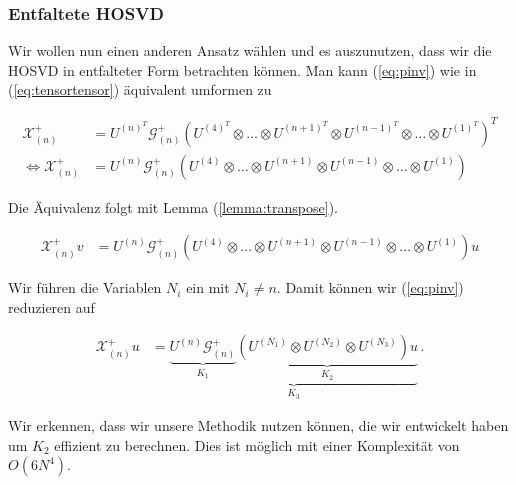 \subsubsection{Entfaltete HOSVD}
Wir wollen nun einen anderen Ansatz wählen und es auszunutzen, dass wir die HOSVD in entfalteter Form betrachten können.
Man kann (\ref{eq:pinv}) wie in (\ref{eq:tensortensor}) äquivalent umformen zu

\begin{equation}
\begin{aligned}
\mathscr{X}^{+}_{(n)}  &= U^{ (n) ^{T} }  \mathscr{G}^{+}_{(n)} ( U^{ (4) ^{T} } \otimes \dots \otimes U^{ (n+1) ^{T} } \otimes U^{ (n-1) ^{T} } \otimes \dots \otimes U^{ (1) ^{T} })^{T} \\ \iff
\mathscr{X}^{+}_{(n)} &= U^{ (n)  }  \mathscr{G}^{+}_{(n)} ( U^{ (4)  } \otimes \dots \otimes U^{ (n+1) } \otimes U^{ (n-1) } \otimes \dots \otimes U^{ (1) })
\end{aligned}
\end{equation}

Die Äquivalenz folgt mit Lemma (\ref{lemma:transpose}).

\begin{equation} \label{eq:pinvv}
\begin{aligned}
\mathscr{X}^{+}_{(n)}v&= U^{ (n)  }  \mathscr{G}^{+}_{(n)} ( U^{ (4)  } \otimes \dots \otimes U^{ (n+1) } \otimes U^{ (n-1) } \otimes \dots \otimes U^{ (1) }) u
\end{aligned}
\end{equation}

Wir führen die Variablen $N_i$ ein mit $N_i \neq n$. Damit können wir (\ref{eq:pinv}) reduzieren auf

\begin{equation} \label{eq:pinvcase}
\begin{aligned}
\mathscr{X}^{+}_{(n)} u&= \underbrace{\underbrace{U^{ (n) }  \mathscr{G}^{+}_{(n)}}_{K_1} \underbrace{( U^{ (N_{1})  } \otimes U^{ (N_{2})}  \otimes U^{ (N_{3}) }) u}_{K_2}}_{K_3} \,.
\end{aligned}
\end{equation}
 

Wir erkennen, dass wir unsere Methodik nutzen können, die wir entwickelt haben um $K_2$ effizient zu berechnen. Dies ist möglich mit einer Komplexität von $O(6N^4)$.

